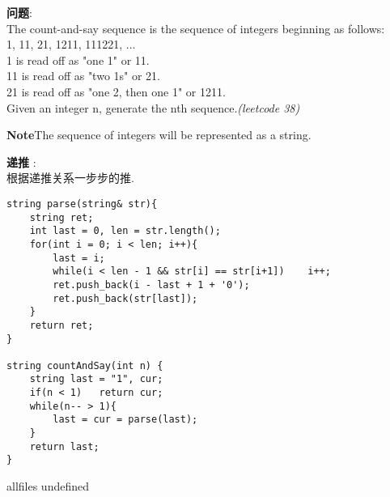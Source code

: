 \documentclass{article}
\begin{document}
\begin{CJK}{UTF8}{gbsn}     %

\else
    
\begin{description}
    \item{\textbf{问题}}:\\
	The count-and-say sequence is the sequence of integers beginning as follows:\\
	1, 11, 21, 1211, 111221, ...\\
	1 is read off as "one 1" or 11.\\
	11 is read off as "two 1s" or 21.\\
	21 is read off as "one 2, then one 1" or 1211.\\
	Given an integer n, generate the nth sequence.\textit{(leetcode 38)}
	\item{\textbf{Note}}The sequence of integers will be represented as a string. 
    \item{\textbf{递推}} : 
    \\根据递推关系一步步的推.
    \begin{lstlisting}
string parse(string& str){
	string ret;
	int last = 0, len = str.length();
	for(int i = 0; i < len; i++){
		last = i;
		while(i < len - 1 && str[i] == str[i+1])	i++;
		ret.push_back(i - last + 1 + '0');	
		ret.push_back(str[last]);	
	}
	return ret;
}

string countAndSay(int n) {
	string last = "1", cur;
	if(n < 1)	return cur;
	while(n-- > 1){
		last = cur = parse(last);
	}
	return last;
}
    \end{lstlisting}
\end{description}

\fi

\ifx allfiles undefined
\end{CJK}
\end{document}
